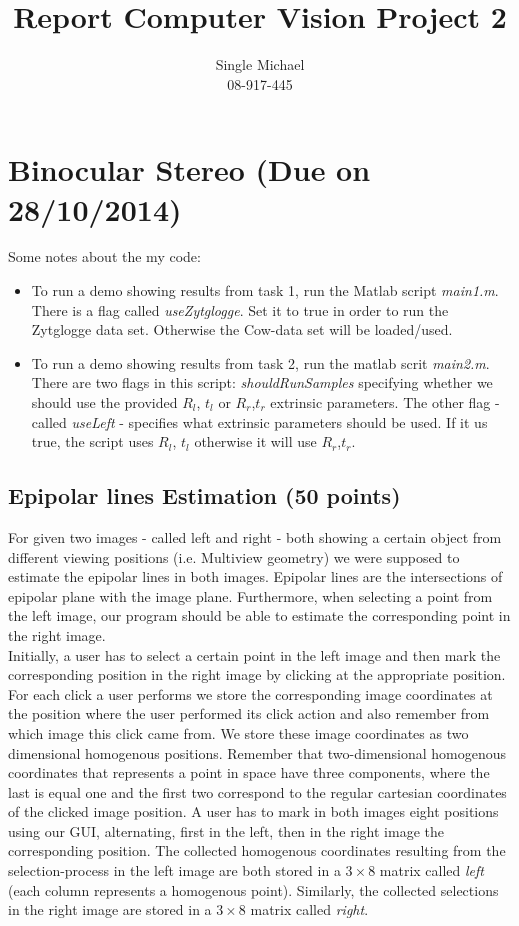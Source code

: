 \documentclass{paper}
\title{Report Computer Vision Project 2}
\author{Single Michael\\08-917-445}
\begin{document}
\maketitle


\section{Binocular Stereo (Due on 28/10/2014)}

Some notes about the my code:
\begin{itemize}
 \item To run a demo showing results from task 1, run the Matlab script \emph{main1.m}. There is a flag called \emph{useZytglogge}. Set it to true in order to run the Zytglogge data set. Otherwise the Cow-data set will be loaded/used.
 \item To run a demo showing results from task 2, run the matlab scrit \emph{main2.m}. There are two flags in this script: \emph{shouldRunSamples} specifying whether we should use the provided $R_l$, $t_l$ or $R_r$,$t_r$ extrinsic parameters. The other flag - called  \emph{useLeft} - specifies what extrinsic parameters should be used. If it us true, the script uses $R_l$, $t_l$ otherwise it will use $R_r$,$t_r$.  
\end{itemize}


\subsection{Epipolar lines Estimation (50 points)}
For given two images - called left and right - both showing a certain object from different viewing positions (i.e. Multiview geometry) we were supposed to estimate the epipolar lines in both images. Epipolar lines are the intersections of epipolar plane with the image plane. Furthermore, when selecting a point from the left image, our program should be able to estimate the corresponding point in the right image. \\

Initially, a user has to select a certain point in the left image and then mark the corresponding position in the right image by clicking at the appropriate position. For each click a user performs we store the corresponding image coordinates at the position where the user performed its click action and also remember from which image this click came from. We store these image coordinates as two dimensional homogenous positions. Remember that two-dimensional homogenous coordinates that represents a point in space have three components, where the last is equal one and the first two correspond to the regular cartesian coordinates of the clicked image position. A user has to mark in both images eight positions using our GUI, alternating, first in the left, then in the right image the corresponding position. The collected homogenous coordinates resulting from the selection-process in the left image are both stored in a $3 \times 8$ matrix called \emph{left} (each column represents a homogenous point). Similarly, the collected selections in the right image are stored in a $3 \times 8$ matrix called \emph{right}. \\
\end{document}
